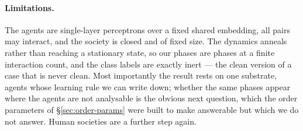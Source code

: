 \paragraph{Limitations.} The agents are single-layer perceptrons over a fixed shared
embedding, all pairs may interact, and the society is closed and of fixed size. The
dynamics anneals rather than reaching a stationary state, so our phases are phases at
a finite interaction count, and the class labels are exactly inert --- the clean
version of a case that is never clean. Most importantly the result rests on one
substrate, agents whose learning rule we can write down; whether the same phases
appear where the agents are not analysable is the obvious next question, which the
order parameters of \S\ref{sec:order-params} were built to make answerable but which
we do not answer. Human societies are a further step again.
